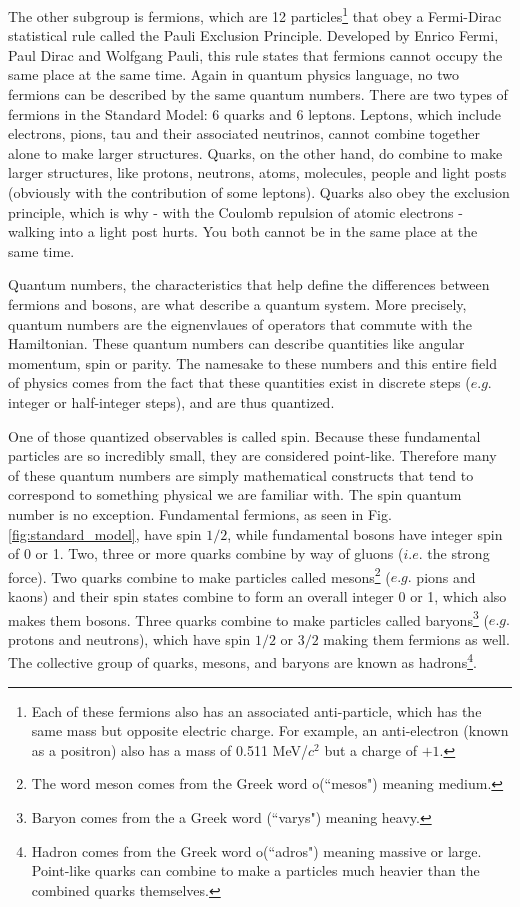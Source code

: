 The other subgroup is fermions, which are 12 particles\footnote{Each of these fermions also has an associated anti-particle, which has the same mass but opposite electric charge. For example, an anti-electron (known as a positron) also has a mass of 0.511 MeV/$c^2$ but a charge of $+1$.} that obey a Fermi-Dirac statistical rule called the Pauli Exclusion Principle. Developed by Enrico Fermi, Paul Dirac and Wolfgang Pauli, this rule states that fermions cannot occupy the same place at the same time. Again in quantum physics language, no two fermions can be described by the same quantum numbers. There are two types of fermions in the Standard Model: 6 quarks and 6 leptons. Leptons, which include electrons, pions, tau and their associated neutrinos, cannot combine together alone to make larger structures. Quarks, on the other hand, do combine to make larger structures, like protons, neutrons, atoms, molecules, people and light posts (obviously with the contribution of some leptons). Quarks also obey the exclusion principle, which is why - with the Coulomb repulsion of atomic electrons - walking into a light post hurts. You both cannot be in the same place at the same time.

Quantum numbers, the characteristics that help define the differences between fermions and bosons, are what describe a quantum system. More precisely, quantum numbers are the eignenvlaues of operators that commute with the Hamiltonian. These quantum numbers can describe quantities like angular momentum, spin or parity. The namesake to these numbers and this entire field of physics comes from the fact that these quantities exist in discrete steps ($e.g.$ integer or half-integer steps), and are thus quantized.

One of those quantized observables is called spin. Because these fundamental particles are so incredibly small, they are considered point-like. Therefore many of these quantum numbers are simply mathematical constructs that tend to correspond to something physical we are familiar with. The spin quantum number is no exception. Fundamental fermions, as seen in Fig. \ref{fig:standard_model}, have spin $1/2$, while fundamental bosons have integer spin of 0 or 1. Two, three or more quarks combine by way of gluons ($i.e.$ the strong force). Two quarks combine to make particles called mesons\footnote{The word meson comes from the Greek word \textmu \textepsilon \textsigma o\textsigma   (``mesos") meaning medium.}  ($e.g.$ pions and kaons) and their spin states combine to form an overall integer 0 or 1, which also makes them bosons. Three quarks combine to make particles called baryons\footnote{Baryon comes from the a Greek word \textbeta \textalpha \textrho \textupsilon \textsigma  (``varys") meaning heavy.} ($e.g.$ protons and neutrons), which have spin $1/2$ or $3/2$ making them fermions as well. The collective group of quarks, mesons, and baryons are known as hadrons\footnote{Hadron comes from the Greek word  \textalpha \textdelta \textrho o\textsigma  (``adros") meaning massive or large. Point-like quarks can combine to make a particles much heavier than the combined quarks themselves.}.

